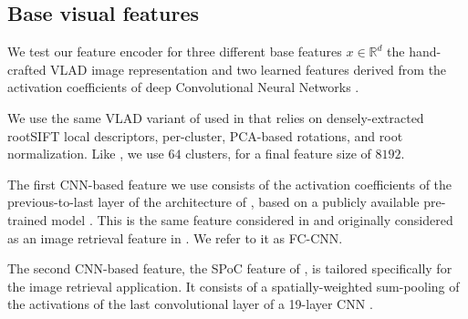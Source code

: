 \subsection{Base visual features}
We test our feature encoder for three different base features $x\in\mathbb{R}^d$ the hand-crafted VLAD image representation \cite{Delhumeau2013} and two learned features derived from the activation coefficients of deep Convolutional Neural Networks \cite{Krizhevsky2012,babenko15}.

We use the same VLAD variant of \cite{Delhumeau2013} used in \cite{ZePe15} that relies on densely-extracted rootSIFT \cite{3things} local descriptors, per-cluster, PCA-based rotations, and root normalization. Like \cite{ZePe15}, we use $64$ clusters, for a final feature size of $8192$.

The first CNN-based feature we use consists of the activation coefficients of the previous-to-last layer of the architecture of \cite{Krizhevsky2012}, based on a publicly available pre-trained model \cite{jia2014caffe}. This is the same feature considered in \cite{ZePe15} and originally considered as an image retrieval feature in \cite{Sharif}. We refer to it as FC-CNN. 

The second CNN-based feature, the SPoC feature of \cite{babenko15}, is tailored specifically for the image retrieval application. It consists of a spatially-weighted sum-pooling of the activations of the last convolutional layer of a 19-layer CNN \cite{Simonyan2014}.



